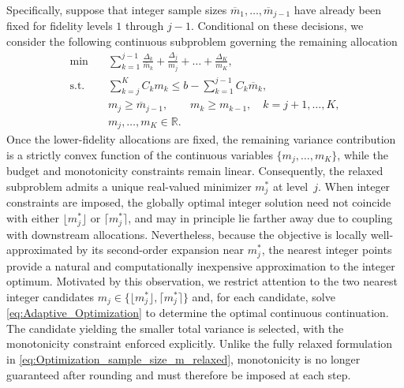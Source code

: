 Specifically, suppose that integer sample sizes $\overline{m}_1,\ldots,\overline{m}_{j-1}$ have already been fixed for fidelity levels $1$ through $j-1$. Conditional on these decisions, we consider the following continuous subproblem governing the remaining allocation
%
\begin{subequations}\label{eq:Adaptive_Optimization}
\begin{align}
    \min \quad & \sum_{k=1}^{j-1}\frac{\Delta_k}{\overline{m}_k}
    + \frac{\Delta_j}{m_j}
    + \ldots + \frac{\Delta_K}{m_K},\\
    \text{s.t.} \quad &\sum_{k=j}^K C_k m_k \le b - \sum_{k=1}^{j-1} C_k\overline{m}_k, \\
    & m_j \ge \overline{m}_{j-1},\qquad m_k \ge m_{k-1}, \quad k=j+1,\ldots,K, \label{eq:Adaptive_Optimization_obj_c}\\
    & m_j,\ldots,m_K \in \mathbb{R}.
\end{align}
\end{subequations}
%
Once the lower-fidelity allocations are fixed, the remaining variance contribution is a strictly convex function of the continuous variables $\{m_j,\ldots,m_K\}$, while the budget and monotonicity constraints remain linear. Consequently, the relaxed subproblem admits a unique real-valued minimizer $m_j^*$ at level~$j$. When integer constraints are imposed, the globally optimal integer solution need not coincide with either $\lfloor m_j^* \rfloor$ or $\lceil m_j^* \rceil$, and may in principle lie farther away due to coupling with downstream allocations. Nevertheless, because the objective is locally well-approximated by its second-order expansion near $m_j^*$, the nearest integer points provide a natural and computationally inexpensive approximation to the integer optimum. Motivated by this observation, we restrict attention to the two nearest integer candidates $m_j \in \{\lfloor m_j^* \rfloor, \lceil m_j^* \rceil\}$ and, for each candidate, solve \eqref{eq:Adaptive_Optimization} to determine the optimal continuous continuation. The candidate yielding the smaller total variance is selected, with the monotonicity constraint enforced explicitly. Unlike the fully relaxed formulation in \eqref{eq:Optimization_sample_size_m_relaxed}, monotonicity is no longer guaranteed after rounding and must therefore be imposed at each step.

